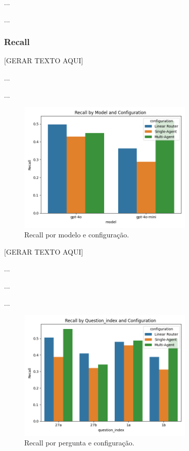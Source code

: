             ...

            ...

        
        \subsubsection{Recall}
        
            [GERAR TEXTO AQUI]

            ...

            ...
            
            \begin{figure}[h!]
                \centering              
                \includegraphics[width=0.75\textwidth]{images_part_2/model_recall_model_configuration.png}
                \caption{Recall por modelo e configuração.}
                \label{fig:aaaa}
            \end{figure}

            [GERAR TEXTO AQUI]

            ...

            ...

            ...
            
            \begin{figure}[h!]
                \centering              
                \includegraphics[width=0.75\textwidth]{images_part_2/question_recall_question_index_configuration.png}
                \caption{Recall por pergunta e configuração.}
                \label{fig:aaaa}
            \end{figure}

